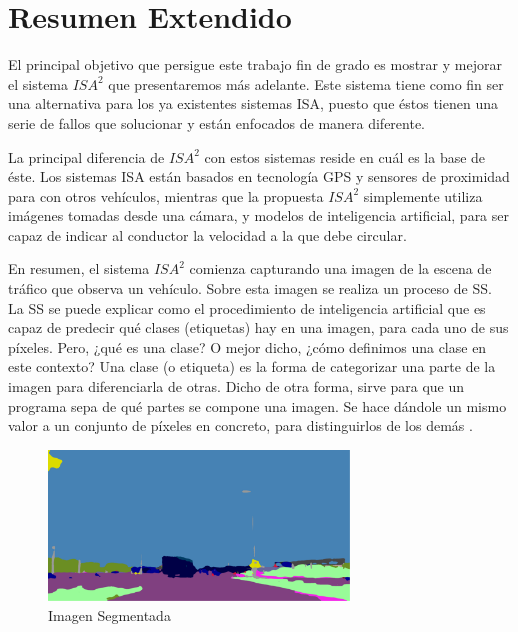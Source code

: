 \chapter{Resumen Extendido}

El principal objetivo que persigue este trabajo fin de grado es mostrar y mejorar el sistema $ISA^{2}$ que presentaremos más adelante. Este sistema tiene como fin ser una alternativa para los ya existentes sistemas \ac{ISA}, puesto que éstos tienen una serie de fallos que solucionar y están enfocados de manera diferente.

La principal diferencia de $ISA^{2}$ con estos sistemas reside en cuál es la base de éste. Los sistemas \ac{ISA} están basados en tecnología \ac{GPS} y sensores de proximidad para con otros vehículos, mientras que la propuesta $ISA^{2}$ simplemente utiliza imágenes tomadas desde una cámara, y modelos de inteligencia artificial, para ser capaz de indicar al conductor la velocidad a la que debe circular.

En resumen, el sistema $ISA^{2}$ comienza capturando una imagen de la escena de tráfico que observa un vehículo. Sobre esta imagen se realiza un proceso de \ac{SS}. La \ac{SS} se puede explicar como el procedimiento de inteligencia artificial que es capaz de predecir qué clases (etiquetas) hay en una imagen, para cada uno de sus píxeles. Pero, ¿qué es una clase? O mejor dicho, ¿cómo definimos una clase en este contexto? Una clase (o etiqueta) es la forma de categorizar una parte de la imagen para diferenciarla de otras. Dicho de otra forma, sirve para que un programa sepa de qué partes se compone una imagen. Se hace dándole un mismo valor a un conjunto de píxeles en concreto, para distinguirlos de los demás \cite{deeplab}.

\begin{figure}[H]
  \centering
  \includegraphics[width=8cm]{Figuras/Ejemplo_Imagen_Segmentada.eps}
  \caption{Imagen Segmentada}
    \label{fig:ImgSegm}
\end{figure}

